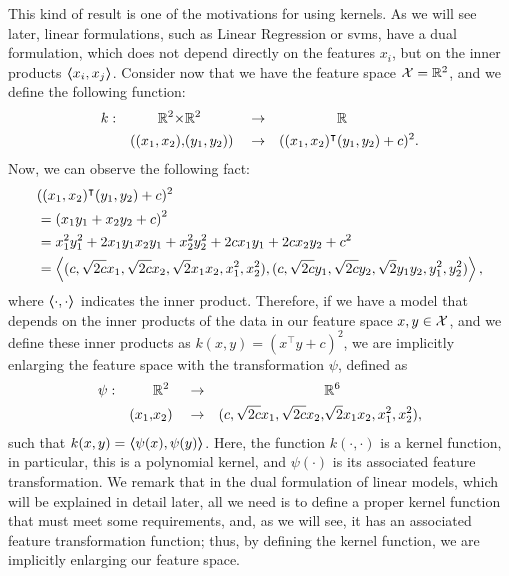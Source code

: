 This kind of result is one of the motivations for using kernels. 
As we will see later, linear formulations, such as Linear Regression or \acrshort{svms}, have a dual formulation, which does not depend directly on the features $x_i$, but on the inner products $\bm{\left\langle} x_i, x_j \bm{\right\rangle}$.
Consider now that we have the feature space $\mathcal{X} = \mathbb{R}^2$, and we define the following function:
\begin{equation}
    \begin{aligned}
        \nonumber
        k: & &\mathbb{R}^2 \times &\mathbb{R}^2 & &\to& &\mathbb{R} \\
        & &((x_1, x_2), & (y_1, y_2))   & &\to& ((x_1, x_2)^\intercal &(y_1, y_2) + c)^2 .
    \end{aligned}
\end{equation}
Now, we can observe the following fact:
\begin{equation}
    \nonumber
    \begin{aligned}
        &((x_1, x_2)^\intercal (y_1, y_2) + c)^2 \\
        &= \left(x_1 y_1 + x_2 y_2 + c \right)^2 \\
        &= x_1^2 y_1^2 + 2 x_1 y_1 x_2 y_1+ x_2^2 y_2^2 + 2 c x_1 y_1 + 2 c x_2 y_2 + c^2 \\
        &= \bm{\left\langle} (c, \sqrt{2c} x_1, \sqrt{2c} x_2, \sqrt{2} x_1 x_2, x_1^2, x_2^2), (c, \sqrt{2c} y_1, \sqrt{2c} y_2, \sqrt{2} y_1 y_2, y_1^2, y_2^2) \bm{\right\rangle},
    \end{aligned}
\end{equation}
where $\bm{\left\langle} \cdot, \cdot \bm{\right\rangle}$ indicates the inner product.
Therefore, if we have a model that depends on the inner products of the data in our feature space $x, y \in \mathcal{X}$, and we define these inner products as $k(x, y) = (x^\intercal y + c)^2$, we are implicitly enlarging the feature space with the transformation $\psi$, defined as
\begin{equation}
    \begin{aligned}
        \nonumber
        \psi: & &&\mathbb{R}^2 & &\to& &\mathbb{R}^6 \\
        & &(x_1,& x_2)& &\to& (c, \sqrt{2c} x_1, \sqrt{2c} x_2,& \sqrt{2} x_1 x_2, x_1^2, x_2^2) ,
    \end{aligned}
\end{equation}
such that $k(x, y) = \bm{\left\langle} \psi(x), \psi(y) \bm{\right\rangle}$.
%
Here, the function $k(\cdot, \cdot)$ is a kernel function, in particular, this is a polynomial kernel, and $\psi(\cdot)$ is its associated feature transformation. 
We remark that in the dual formulation of linear models, which will be explained in detail later, all we need is to define a proper kernel function that must meet some requirements, and, as we will see, it has an associated feature transformation function; thus, by defining the kernel function, we are implicitly enlarging our feature space.




